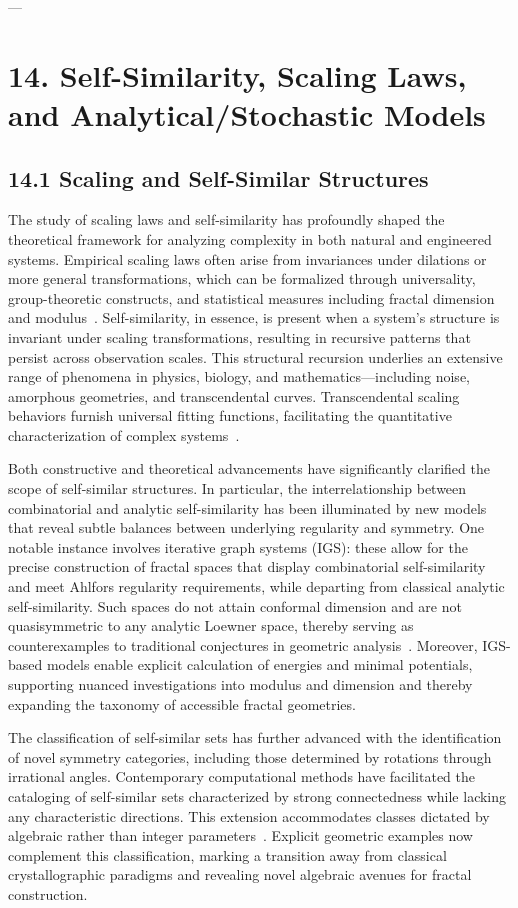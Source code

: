 \documentclass[11pt]{article}
\begin{document}
---
\section{14. Self-Similarity, Scaling Laws, and Analytical/Stochastic Models}

\subsection{14.1 Scaling and Self-Similar Structures}

The study of scaling laws and self-similarity has profoundly shaped the theoretical framework for analyzing complexity in both natural and engineered systems. Empirical scaling laws often arise from invariances under dilations or more general transformations, which can be formalized through universality, group-theoretic constructs, and statistical measures including fractal dimension and modulus~\cite{ref56,ref63}. Self-similarity, in essence, is present when a system's structure is invariant under scaling transformations, resulting in recursive patterns that persist across observation scales. This structural recursion underlies an extensive range of phenomena in physics, biology, and mathematics—including noise, amorphous geometries, and transcendental curves. Transcendental scaling behaviors furnish universal fitting functions, facilitating the quantitative characterization of complex systems~\cite{ref56}.

Both constructive and theoretical advancements have significantly clarified the scope of self-similar structures. In particular, the interrelationship between combinatorial and analytic self-similarity has been illuminated by new models that reveal subtle balances between underlying regularity and symmetry. One notable instance involves iterative graph systems (IGS): these allow for the precise construction of fractal spaces that display combinatorial self-similarity and meet Ahlfors regularity requirements, while departing from classical analytic self-similarity. Such spaces do not attain conformal dimension and are not quasisymmetric to any analytic Loewner space, thereby serving as counterexamples to traditional conjectures in geometric analysis~\cite{ref11}. Moreover, IGS-based models enable explicit calculation of energies and minimal potentials, supporting nuanced investigations into modulus and dimension and thereby expanding the taxonomy of accessible fractal geometries.

The classification of self-similar sets has further advanced with the identification of novel symmetry categories, including those determined by rotations through irrational angles. Contemporary computational methods have facilitated the cataloging of self-similar sets characterized by strong connectedness while lacking any characteristic directions. This extension accommodates classes dictated by algebraic rather than integer parameters~\cite{ref31}. Explicit geometric examples now complement this classification, marking a transition away from classical crystallographic paradigms and revealing novel algebraic avenues for fractal construction.
\end{document}
